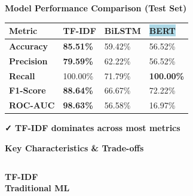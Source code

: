 \documentclass[final]{beamer}
\newlength{\onecolwid}
\newlength{\twocolwid}
\begin{document}
\begin{frame}[fragile]
\begin{columns}[t]
\begin{column}{\onecolwid}
\end{column}

\begin{column}{\twocolwid}

\begin{block}{\Large \textbf{Model Performance Comparison (Test Set)}}
  \vspace{0.2cm}
  
  \begin{table}[h]
    \centering
    \small
    \begin{tabularx}{\textwidth}{|l|Y|Y|Y|}
      \hline
      \textbf{Metric} & \textbf{\colorbox{accentgreen!30}{TF-IDF}} & \textbf{\colorbox{accent!30}{BiLSTM}} & \textbf{\colorbox{lightblue}{BERT}} \\
      \hline
      \textbf{Accuracy} & \textbf{85.51\%} & 59.42\% & 56.52\% \\
      \hline
      \textbf{Precision} & \textbf{79.59\%} & 62.22\% & 56.52\% \\
      \hline
      \textbf{Recall} & 100.00\% & 71.79\% & \textbf{100.00\%} \\
      \hline
      \textbf{F1-Score} & \textbf{88.64\%} & 66.67\% & 72.22\% \\
      \hline
      \textbf{ROC-AUC} & \textbf{98.63\%} & 56.58\% & 16.97\% \\
      \hline
    \end{tabularx}
  \end{table}
  
  \vspace{0.3cm}
  {\small \textbf{\textcolor{accentgreen}{✓ TF-IDF dominates across most metrics}}}
\end{block}

\begin{block}{\Large \textbf{Key Characteristics \& Trade-offs}}
  
  \begin{columns}[T]
    \begin{column}{0.33\textwidth}
      \centering
      \textbf{\colorbox{accentgreen!40}{TF-IDF}} \\
      {\small \textbf{Traditional ML}}
      

\end{column}
\end{columns}
\end{block}
\end{column}
\end{columns}
\end{frame}
\end{document}
